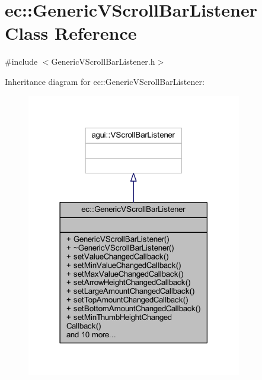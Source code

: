 \hypertarget{classec_1_1_generic_v_scroll_bar_listener}{}\section{ec\+:\+:Generic\+V\+Scroll\+Bar\+Listener Class Reference}
\label{classec_1_1_generic_v_scroll_bar_listener}


{\ttfamily \#include $<$Generic\+V\+Scroll\+Bar\+Listener.\+h$>$}



Inheritance diagram for ec\+:\+:Generic\+V\+Scroll\+Bar\+Listener\+:\nopagebreak
\begin{figure}[H]
\begin{center}
\leavevmode
\includegraphics[width=266pt]{classec_1_1_generic_v_scroll_bar_listener__inherit__graph}
\end{center}
\end{figure}


